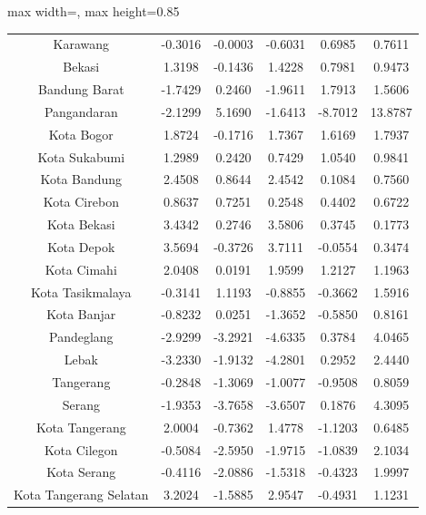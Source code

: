 \begin{table}[H]
\begin{adjustbox}{max width=\textwidth, max height=0.85\textheight}
\begin{tabular}{|c|c|c|c|c|c|}
Karawang & -0.3016 & -0.0003 & -0.6031 & 0.6985 & 0.7611 \\
Bekasi & 1.3198 & -0.1436 & 1.4228 & 0.7981 & 0.9473 \\
Bandung Barat & -1.7429 & 0.2460 & -1.9611 & 1.7913 & 1.5606 \\
Pangandaran & -2.1299 & 5.1690 & -1.6413 & -8.7012 & 13.8787 \\
Kota Bogor & 1.8724 & -0.1716 & 1.7367 & 1.6169 & 1.7937 \\
Kota Sukabumi & 1.2989 & 0.2420 & 0.7429 & 1.0540 & 0.9841 \\
Kota Bandung & 2.4508 & 0.8644 & 2.4542 & 0.1084 & 0.7560 \\
Kota Cirebon & 0.8637 & 0.7251 & 0.2548 & 0.4402 & 0.6722 \\
Kota Bekasi & 3.4342 & 0.2746 & 3.5806 & 0.3745 & 0.1773 \\
Kota Depok & 3.5694 & -0.3726 & 3.7111 & -0.0554 & 0.3474 \\
Kota Cimahi & 2.0408 & 0.0191 & 1.9599 & 1.2127 & 1.1963 \\
Kota Tasikmalaya & -0.3141 & 1.1193 & -0.8855 & -0.3662 & 1.5916 \\
Kota Banjar & -0.8232 & 0.0251 & -1.3652 & -0.5850 & 0.8161 \\
Pandeglang & -2.9299 & -3.2921 & -4.6335 & 0.3784 & 4.0465 \\
Lebak & -3.2330 & -1.9132 & -4.2801 & 0.2952 & 2.4440 \\
Tangerang & -0.2848 & -1.3069 & -1.0077 & -0.9508 & 0.8059 \\
Serang & -1.9353 & -3.7658 & -3.6507 & 0.1876 & 4.3095 \\
Kota Tangerang & 2.0004 & -0.7362 & 1.4778 & -1.1203 & 0.6485 \\
Kota Cilegon & -0.5084 & -2.5950 & -1.9715 & -1.0839 & 2.1034 \\
Kota Serang & -0.4116 & -2.0886 & -1.5318 & -0.4323 & 1.9997 \\
Kota Tangerang Selatan & 3.2024 & -1.5885 & 2.9547 & -0.4931 & 1.1231 \\
\hline
\end{tabular}
\end{adjustbox}
\end{table}